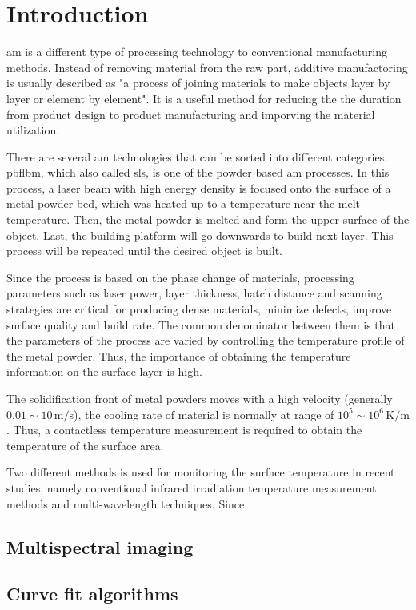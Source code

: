 \glsresetall%
\chapter{Introduction}%

\gls{am} is a different type of processing technology to conventional 
manufacturing methods. Instead of removing material from the raw part, 
additive manufactoring is usually described as "a process of joining materials
to make objects layer by layer or element by element"\cite{Frazier.2014}.
It is a useful method for reducing the the duration from product design 
to product manufacturing and imporving the material 
utilization\cite{Swift.2013b}. 


There are several \gls{am} technologies that can be sorted into different 
categories. \gls{pbflbm}, which also called \gls{sls}, is one of the powder 
based \gls{am} processes\cite{Kruth.1991}. In this process, a laser beam 
with high energy density is focused onto the surface of a metal powder bed, 
which was heated up to a temperature near the melt temperature. Then, the 
metal powder is melted and form the upper surface of the object. Last, the 
building platform will go downwards to build next layer. This process will be 
repeated until the desired object is built\cite{RevillaLeon.2019}.


Since the process is based on the phase change of materials, processing parameters 
such as laser power, layer thickness, hatch distance and scanning strategies 
are critical for producing dense materials, minimize defects, improve 
surface quality and build rate\cite{Oliveira.2020}. The common 
denominator between them is that the parameters of the process 
are varied by controlling the temperature profile of the metal powder\cite{Swift.2013b}. 
Thus, the importance of obtaining the temperature information on 
the surface layer is high. 


The solidification front of metal powders moves with a high velocity (generally 
$0.01 \sim 10 \, \text{m/s}$)\cite{DebRoy.2018}, the cooling rate of material 
is normally at range of $10^5 \sim 10^6 \, \text{K/m}$\cite{Oliveira.2020}. 
Thus, a contactless temperature measurement is required to obtain the temperature 
of the surface area. 


Two different methods is used for monitoring the surface temperature 
in recent studies, namely conventional infrared irradiation 
temperature measurement methods and multi-wavelength techniques\cite{Li.2019}.
Since 

\section{Multispectral imaging}

\section{Curve fit algorithms}
